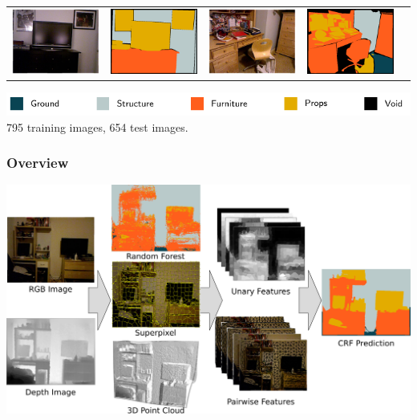\documentclass[final,ignorenonframetext,compress]{beamer}
\begin{document}
\begin{frame}
\begin{tabularx}{\linewidth}{@{\extracolsep{\fill}}ccccc}
        \includegraphics[width=.22\textwidth]{images/00191_image.png}&%
        \includegraphics[width=.22\linewidth]{images/00191_gt.png}&
        \includegraphics[width=.22\textwidth]{images/01052_image.png}&%
        \includegraphics[width=.22\linewidth]{images/01052_gt.png}\\

        \end{tabularx}
        \includegraphics[width=\linewidth]{legend.pdf}\\
        795 training images, 654 test images.
    \end{frame}
    
    \begin{frame}
        \frametitle{Overview}
        \begin{center}
            \includegraphics[width=.9\linewidth]{images/teaser}
        \end{center}
    \end{frame}
\end{document}
